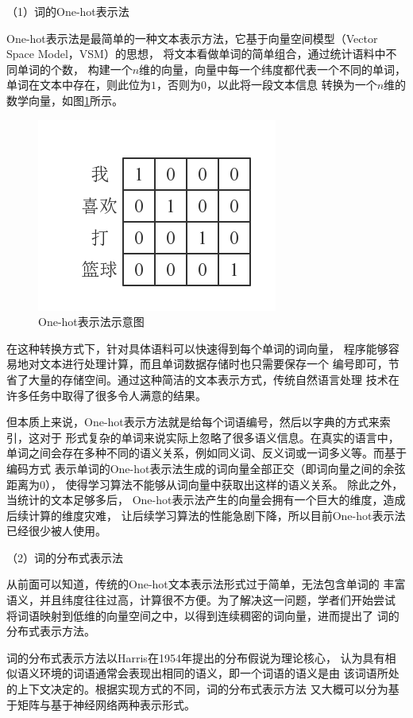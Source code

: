 \documentclass{standalone}
\begin{document}
（1）词的One-hot表示法

One-hot表示法是最简单的一种文本表示方法，它基于向量空间模型（Vector Space Model，VSM）的思想，
将文本看做单词的简单组合，通过统计语料中不同单词的个数，
构建一个$n$维的向量，向量中每一个纬度都代表一个不同的单词，
单词在文本中存在，则此位为$1$，否则为$0$，以此将一段文本信息
转换为一个$n$维的数学向量，如图\ref{one-hot}所示。
\begin{figure}[h]
    \includegraphics[scale=0.5]{picture/one-hot.png}
    \caption{One-hot表示法示意图}
    \label{one-hot}
\end{figure}

在这种转换方式下，针对具体语料可以快速得到每个单词的词向量，
程序能够容易地对文本进行处理计算，而且单词数据存储时也只需要保存一个
编号即可，节省了大量的存储空间。通过这种简洁的文本表示方式，传统自然语言处理
技术在许多任务中取得了很多令人满意的结果。

但本质上来说，One-hot表示方法就是给每个词语编号，然后以字典的方式来索引，这对于
形式复杂的单词来说实际上忽略了很多语义信息。在真实的语言中，
单词之间会存在多种不同的语义关系，例如同义词、反义词或一词多义等。而基于编码方式
表示单词的One-hot表示法生成的词向量全部正交（即词向量之间的余弦距离为0），
使得学习算法不能够从词向量中获取出这样的语义关系。
除此之外，当统计的文本足够多后，
One-hot表示法产生的向量会拥有一个巨大的维度，造成后续计算的维度灾难，
让后续学习算法的性能急剧下降，所以目前One-hot表示法已经很少被人使用。

（2）词的分布式表示法

从前面可以知道，传统的One-hot文本表示法形式过于简单，无法包含单词的
丰富语义，并且纬度往往过高，计算很不方便。为了解决这一问题，学者们开始尝试
将词语映射到低维的向量空间之中，以得到连续稠密的词向量，进而提出了
词的分布式表示方法。

词的分布式表示方法以Harris在1954年提出的分布假说为理论核心，
认为具有相似语义环境的词语通常会表现出相同的语义，即一个词语的语义是由
该词语所处的上下文决定的。根据实现方式的不同，词的分布式表示方法
又大概可以分为基于矩阵与基于神经网络两种表示形式。
\end{document}
